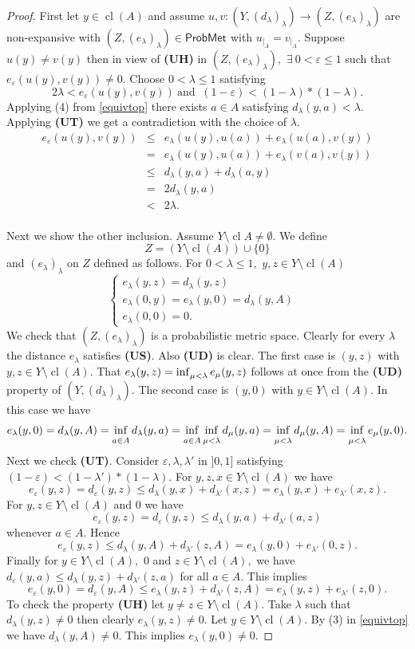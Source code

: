 \documentclass[10pt,a4paper]{amsart}
\newcommand{\PM}{\ensuremath{\mathsf{ProbMet_{}}}}
\DeclareMathOperator{\cl}{cl}
\renewcommand{\inf}{\myinf}
\renewcommand{\l}{\ensuremath{\lambda}}
\DeclareMathOperator*{\myinf}{in\vphantom{p}f}
\def\rw{\rightarrow}
\newcommand{\ve}{\ensuremath{\varepsilon}}
\begin{document}
\begin{proof}
First let $y \in \cl(A)$ and assume $u,v : (Y, (d_\l)_\l) \rw (Z, (e_\l)_\l)$ are non-expansive with $(Z, (e_\l)_\l) \in \PM$ with $u_{|_A} = v_{|_A}.$ Suppose $u(y) \not = v(y)$ then in view of {\bf(UH)} in $(Z, (e_\l)_\l),$ $\exists \  0 < \ve \leq 1$ such that $e_\ve(u(y) , v(y)) \not = 0.$
Choose $0 < \l \leq 1$ satisfying $$2 \l < e_\ve (u(y) , v(y)) \  \text{and } \ (1-\ve) < (1-\l) * (1-\l).$$
Applying (4) from \ref{equivtop} there exists $a \in A$ satisfying $d_\l(y,a) < \l$. Applying {\bf(UT)} we get a contradiction with the choice of $\l$.
 \begin{eqnarray*}
 e_\ve(u(y),v(y)) &\leq & e_\l(u(y), u(a)) + e_\l(u(a), v(y))\\
 &=&e_\l(u(y), u(a)) + e_\l(v(a), v(y))\\
 &\leq& d_\l(y,a) + d_\l(a,y)\\
 &=&2d_\l(y,a)\\
 &<& 2\l.\\
 \end{eqnarray*}
 
 Next we show the other inclusion. Assume $Y \setminus \cl{A} \not = \emptyset.$ 
 We define
 $$
 Z = (Y \setminus \cl (A)) \cup \{0\} 
 $$
 and $(e_\l)_\l $ on $Z$ defined as follows.
For $0 < \l \leq 1,$ $y,z \in Y \setminus \cl(A)$
 $$
  \begin{cases}  e_\l(y, z) = d_\l(y,z) \\
 e_\l(0,y) =  e_\l(y, 0) =d_\l(y,A)&\\ 
 e_\l(0,0) = 0. \end{cases}
$$
We check that $(Z, (e_\l)_\l)$ is a probabilistic metric space. Clearly for every $\l$ the distance $e_\l$ satisfies {\bf(US)}.
Also {\bf(UD)} is clear. The first case is $(y, z)$ with $y,z \in Y \setminus \cl(A).$
That $e_\l (y, z) = \inf_{\mu < \l} e_\mu(y, z) $ follows at once from the {\bf(UD)} property of $(Y, (d_\l)_\l).$ The second case is $(y, 0)$ with $y \in Y \setminus \cl(A).$ In this case we have
$$e_\l(y, 0) = d_\l(y,A)= \inf_{a \in A}d_\l(y,a) = \inf_{a \in A} \inf_{\mu < \l} d_\mu (y,a) = \inf_{\mu < \l} d_\mu(y,A)=  \inf_{\mu < \l} e_\mu(y, 0).$$
Next we check {\bf(UT)}. Consider $\ve, \l, \l'$ in $]0,1]$ satisfying $(1-\ve) < (1-\l') * (1-\l).$
For $y,z,x \in Y \setminus \cl(A)$ we have 
$$
e_\ve(y,z) = d_\ve(y,z) \leq d_\l(y,x) +d_{\l'}(x,z) = e_\l(y,x) +e_{\l'}(x,z).
$$
For $y,z \in Y \setminus \cl(A)$ and $0$ we have
$$
e_\ve(y,z) = d_\ve(y,z) \leq d_\l(y,a) +d_{\l'}(a,z) 
$$
whenever $a \in A.$ Hence 
$$
e_\ve(y,z)  \leq d_\l(y,A) +d_{\l'}(z,A) = e_\l(y,0) +e_{\l'}(0,z).
$$
Finally for $y\in Y \setminus \cl(A),$ $0$ and $z\in Y \setminus \cl(A),$  we have $d_\ve(y,a) \leq d_\l(y,z) + d_{\l'} (z,a)$ for all $a \in A.$ This implies
$$
e_\ve(y,0) = d_\ve(y,A) \leq e_\l(y,z) + d_{\l'} (z,A) = e_\l(y,z) + e_{\l'} (z,0).
$$
To check the property {\bf(UH)} let $y \not =z \in Y \setminus \cl(A)$. Take $\l$ such that $d_\l(y,z) \not = 0$ then clearly $e_\l(y,z) \not = 0.$
Let $y \in Y \setminus \cl(A).$ By (3) in \ref{equivtop} we have $d_\l(y,A) \not = 0.$ This implies $e_\l(y,0) \not = 0.$


\end{proof}
\end{document}
